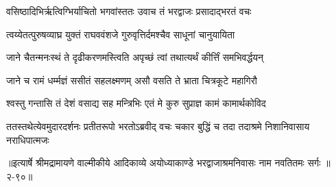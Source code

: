 \twolineshloka
{वसिष्ठादिभिर्ऋत्विग्भिर्याचितो भगवांस्ततः}
{उवाच तं भरद्वाजः प्रसादाद्भरतं वचः} %

\twolineshloka
{त्वय्येतत्पुरुषव्याघ्र युक्तं राघववंशजे}
{गुरुवृत्तिर्दमश्चैव साधूनां चानुयायिता} %

\twolineshloka
{जाने चैतन्मनःस्थं ते दृढीकरणमस्त्विति}
{अपृच्छं त्वां तथात्यर्थं कीर्त्तिं समभिवर्द्धयन्} %

\twolineshloka
{जाने च रामं धर्म्मज्ञं ससीतं सहलक्ष्मणम्}
{असौ वसति ते भ्राता चित्रकूटे महागिरौ} %

\twolineshloka
{श्वस्तु गन्तासि तं देशं वसाद्य सह मन्त्रिभिः}
{एतं मे कुरु सुप्राज्ञ कामं कामार्थकोविद} %

\twolineshloka
{ततस्तथेत्येवमुदारदर्शनः प्रतीतरूपो भरतोऽब्रवीद् वचः}
{चकार बुद्धिं च तदा तदाश्रमे निशानिवासाय नराधिपात्मजः} %


॥इत्यार्षे श्रीमद्रामायणे वाल्मीकीये आदिकाव्ये अयोध्याकाण्डे भरद्वाजाश्रमनिवासः नाम नवतितमः सर्गः ॥२-९०॥
